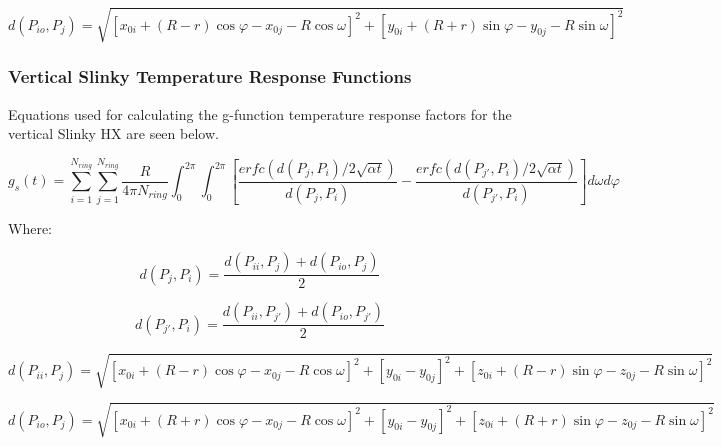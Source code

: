 \begin{equation}
d\left(P_{io},P_j\right) = \sqrt{\left[x_{0i} + \left(R-r\right)\cos \varphi - x_{0j}-R\cos \omega\right]^2 + \left[y_{0i} + \left(R+r\right)\sin \varphi - y_{0j}-R\sin \omega\right]^2}
\end{equation}

\subsubsection{Vertical Slinky Temperature Response Functions}\label{vertical-slinky-temperature-response-functions}

Equations used for calculating the g-function temperature response factors for the vertical Slinky HX are seen below.

\begin{equation}
g_s\left(t\right) = \sum_{i = 1}^{N_{ring}} \sum_{j = 1}^{N_{ring}} \frac{R}{4\pi N_{ring}} \int_0^{2\pi} \int_0^{2\pi} 
            \left[ 
                \frac{erfc\left(d\left(P_j,P_i\right)/2\sqrt{\alpha t}\right)}{d\left(P_j,P_i\right)} - 
                \frac{erfc\left(d\left(P_{j'},P_i\right)/2\sqrt{\alpha t}\right)}{d\left(P_{j'},P_i\right)}
            \right]d\omega d\varphi
\end{equation}

Where:

\begin{equation}
d\left(P_j,P_i\right) = \frac{d\left(P_{ii},P_j\right) + d\left(P_{io},P_j\right)}{2}
\end{equation}

\begin{equation}
d\left(P_{j'},P_i\right) = \frac{d\left(P_{ii},P_{j'}\right) + d\left(P_{io},P_{j'}\right)}{2}
\end{equation}

\begin{equation}
d\left(P_{ii},P_j\right) = \sqrt{\left[x_{0i} + \left(R-r\right)\cos \varphi - x_{0j}-R\cos \omega\right]^2 + \left[y_{0i}-y_{0j}\right]^2 + \left[z_{0i} + \left(R-r\right)\sin \varphi - z_{0j}-R\sin \omega\right]^2}
\end{equation}

\begin{equation}
d\left(P_{io},P_j\right) = \sqrt{\left[x_{0i} + \left(R+r\right)\cos \varphi - x_{0j}-R\cos \omega\right]^2 + \left[y_{0i}-y_{0j}\right]^2 + \left[z_{0i} + \left(R+r\right)\sin \varphi - z_{0j}-R\sin \omega\right]^2}
\end{equation}

